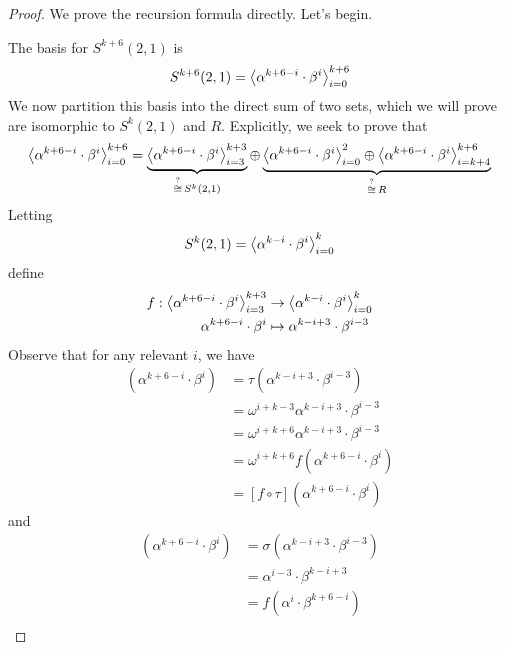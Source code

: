 \documentclass[../psets.tex]{subfiles}
\begin{document}
\begin{enumerate}
\begin{enumerate}
\begin{proof}
            We prove the recursion formula directly. Let's begin.\par
            The basis for $S^{k+6}(2,1)$ is
            \begin{equation*}
                S^{k+6}(2,1) = \left\langle{\alpha^{k+6-i}\cdot\beta^i}\right\rangle_{i=0}^{k+6}
            \end{equation*}
            We now partition this basis into the direct sum of two sets, which we will prove are isomorphic to $S^k(2,1)$ and $R$. Explicitly, we seek to prove that
            \begin{equation*}
                \left\langle{\alpha^{k+6-i}\cdot\beta^i}\right\rangle_{i=0}^{k+6} = \underbrace{\left\langle{\alpha^{k+6-i}\cdot\beta^i}\right\rangle_{i=3}^{k+3}}_{\stackrel{?}{\cong}\,S^k(2,1)}\oplus\underbrace{\left\langle{\alpha^{k+6-i}\cdot\beta^i}\right\rangle_{i=0}^2\oplus\left\langle{\alpha^{k+6-i}\cdot\beta^i}\right\rangle_{i=k+4}^{k+6}}_{\stackrel{?}{\cong}\,R}
            \end{equation*}
            Letting
            \begin{equation*}
                S^k(2,1) = \left\langle{\alpha^{k-i}\cdot\beta^i}\right\rangle_{i=0}^k
            \end{equation*}
            define
            \begin{align*}
                f:\left\langle{\alpha^{k+6-i}\cdot\beta^i}\right\rangle_{i=3}^{k+3} &\to \left\langle{\alpha^{k-i}\cdot\beta^i}\right\rangle_{i=0}^k\\
                \alpha^{k+6-i}\cdot\beta^i &\mapsto \alpha^{k-i+3}\cdot\beta^{i-3}
            \end{align*}
            Observe that for any relevant $i$, we have
            \begin{align*}
                [\tau\circ f](\alpha^{k+6-i}\cdot\beta^i) &= \tau(\alpha^{k-i+3}\cdot\beta^{i-3})\\
                &= \omega^{i+k-3}\alpha^{k-i+3}\cdot\beta^{i-3}\\
                &= \omega^{i+k+6}\alpha^{k-i+3}\cdot\beta^{i-3}\\
                &= \omega^{i+k+6}f(\alpha^{k+6-i}\cdot\beta^i)\\
                &= [f\circ\tau](\alpha^{k+6-i}\cdot\beta^i)
            \end{align*}
            and
            \begin{align*}
                [\sigma\circ f](\alpha^{k+6-i}\cdot\beta^i) &= \sigma(\alpha^{k-i+3}\cdot\beta^{i-3})\\
                &= \alpha^{i-3}\cdot\beta^{k-i+3}\\
                &= f(\alpha^i\cdot\beta^{k+6-i})\\

\end{align*}
\end{proof}
\end{enumerate}
\end{enumerate}
\end{document}
